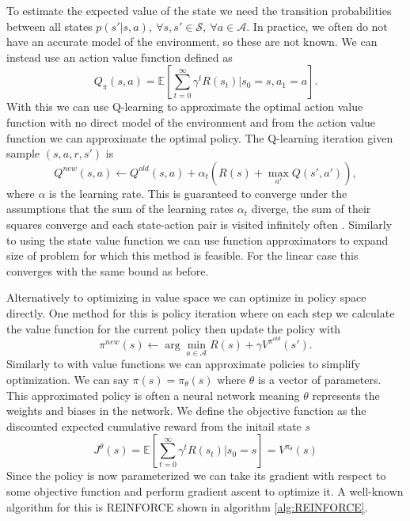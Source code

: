 To estimate the expected value of the state we need the transition probabilities between all states $p(s'|s,a), \ \forall s,s' \in \mathcal{S}, \ \forall a \in \mathcal{A}$. In practice, we often do not have an accurate model of the environment, so these are not known. We can instead use an action value function defined as 
\begin{equation*}
    Q_\pi(s,a) = \mathbb{E} [ \sum_{t=0}^\infty \gamma^t R(s_t)|s_0=s, a_1=a].
\end{equation*}
With this we can use Q-learning to approximate the optimal action value function with no direct model of the environment and from the action value function we can approximate the optimal policy. The Q-learning iteration given sample $(s,a,r,s')$ is 
\begin{equation*}
    Q^{new}(s,a) \leftarrow Q^{old}(s,a) + \alpha_t (R(s) + \max_{a'} Q(s',a')),
\end{equation*} 
where $\alpha$ is the learning rate. This is guaranteed to converge under the assumptions that the sum of the learning rates $\alpha_t$ diverge, the sum of their squares converge and each state-action pair is visited infinitely often \cite{QLearning}. Similarly to using the state value function we can use function approximators to expand size of problem for which this method is feasible. For the linear case this converges with the same bound as before.

Alternatively to optimizing in value space we can optimize in policy space directly. One method for this is policy iteration where on each step we calculate the value function for the current policy then update the policy with 
\begin{equation*}
    \pi^{new}(s) \leftarrow \arg \min_{a \in \mathcal{A}} R(s) + \gamma V^{\pi^{old}}(s').
\end{equation*}
Similarly to with value functions we can approximate policies to simplify optimization. We can say $\pi(s) = \pi_\theta (s)$ where $\theta$ is a vector of parameters. This approximated policy is often a neural network meaning $\theta$ represents the weights and biases in the network. 
We define the objective function as the discounted expected cumulative reward from the initail state $s$ 
\begin{equation*}
    J^\theta(s) = \mathbb{E} [ \sum_{t=0}^\infty \gamma^t R(s_t)|s_0=s] = V^{\pi_\theta}(s)
\end{equation*}
Since the policy is now parameterized we can take its gradient with respect to some objective function and perform gradient ascent to optimize it. A well-known algorithm for this is REINFORCE \cite{REINFORCE} shown in algorithm \ref{alg:REINFORCE}.


